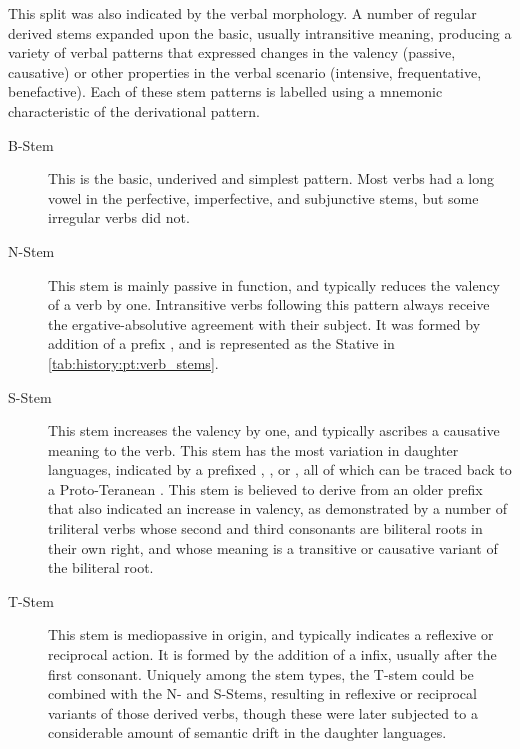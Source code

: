 \documentclass[grammar]{subfiles}
\begin{document}
This split was also indicated by the verbal morphology. 
A number of regular derived stems expanded upon the basic, usually
intransitive meaning, producing a variety of verbal patterns that expressed
changes in the valency (passive, causative) or other properties in the verbal
scenario (intensive, frequentative, benefactive).  Each of these stem patterns
is labelled using a mnemonic characteristic of the derivational pattern.

\begin{description}
  \item[B-Stem] This is the basic, underived and simplest pattern.  Most verbs
    had a long vowel in the perfective, imperfective, and subjunctive stems,
    but some irregular verbs did not.
  \item[N-Stem] This stem is mainly passive in function, and typically reduces
    the valency of a verb by one.  Intransitive verbs following this pattern
    always receive the ergative-absolutive agreement with their subject.  It
    was formed by addition of a prefix , and is represented as the
    Stative in \cref{tab:history:pt:verb_stems}.
  \item[S-Stem] This stem increases the valency by one, and typically ascribes
    a causative meaning to the verb.  This stem has the most variation in
    daughter languages, indicated by a prefixed , ,
     or , all of which can be traced back to a
    Proto-Teranean .  This stem is believed to derive from an older
    prefix that also indicated an increase in valency, as demonstrated by a
    number of triliteral verbs whose second and third consonants are biliteral
    roots in their own right, and whose meaning is a transitive or causative
    variant of the biliteral root.
  \item[T-Stem] This stem is mediopassive in origin, and typically indicates a
    reflexive or reciprocal action.  It is formed by the addition of a
     infix, usually after the first consonant.  Uniquely among the
    stem types, the T-stem could be combined with the N- and S-Stems, resulting
    in reflexive or reciprocal variants of those derived verbs, though these
    were later subjected to a considerable amount of semantic drift in the
    daughter languages.
\end{description}
\end{document}
